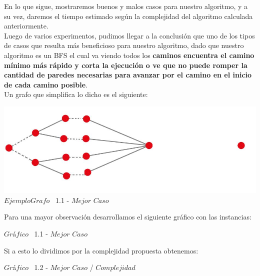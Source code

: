 \indent En lo que sigue, mostraremos buenos y malos casos para nuestro algoritmo, y a su vez, daremos el tiempo estimado 
seg\'un la complejidad del algoritmo calculada anteriormente.\\

Luego de varios experimentos, pudimos llegar a la conclusi\'on que uno de los tipos de casos que resulta m\'as beneficioso para nuestro algoritmo, dado que nuestro algoritmo es un BFS el cual va viendo todos los \textbf{caminos encuentra el camino m\'inimo m\'as r\'apido y corta la ejecuci\'on o ve que no puede romper la cantidad de paredes necesarias para avanzar por el camino en el inicio de cada camino posible}.\\

Un grafo que simplifica lo dicho es el siguiente:

\vspace*{0.3cm} \vspace*{0.3cm}
  \begin{center}
\includegraphics[scale=0.65]{./EJ1/ej1grafomejorcaso.jpeg}
{$Ejemplo Grafo$ \ 1.1 - $Mejor$ $Caso$}
  \end{center}
  \vspace*{0.3cm}


Para una mayor observaci\'on desarrollamos el siguiente gr\'afico con las instancias:\\

\vspace*{0.3cm} \vspace*{0.3cm}
  \begin{center}
 {$Gr$\'a$fico$ \ 1.1 - $Mejor$ $Caso$}
  \end{center}
  \vspace*{0.3cm}


Si a esto lo dividimos por la complejidad propuesta obtenemos:\\

\vspace*{0.3cm} \vspace*{0.3cm}
  \begin{center}
 {$Gr$\'a$fico$ \ 1.2 - $Mejor$ $Caso$ / $Complejidad$}
  \end{center}
  \vspace*{0.3cm}

